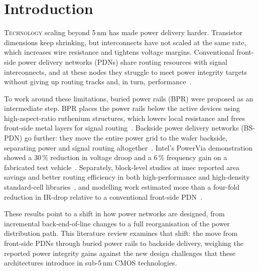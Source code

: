 \section{Introduction}

\lettrine{T}{echnology} scaling beyond 5\,nm has made power delivery harder. Transistor dimensions keep shrinking, but interconnects have not scaled at the same rate, which increases wire resistance and tightens voltage margins. Conventional front-side power delivery networks (PDNs) share routing resources with signal interconnects, and at these nodes they struggle to meet power integrity targets without giving up routing tracks and, in turn, performance~\cite{8993617}.

To work around these limitations, buried power rails (BPR) were proposed as an intermediate step. BPR places the power rails below the active devices using high-aspect-ratio ruthenium structures, which lowers local resistance and frees front-side metal layers for signal routing~\cite{8993617}. Backside power delivery networks (BS-PDN) go further: they move the entire power grid to the wafer backside, separating power and signal routing altogether~\cite{10185208}. Intel's PowerVia demonstration showed a 30\,\% reduction in voltage droop and a 6\,\% frequency gain on a fabricated test vehicle~\cite{10185208}. Separately, block-level studies at imec reported area savings and better routing efficiency in both high-performance and high-density standard-cell libraries~\cite{10631463}, and modelling work estimated more than a four-fold reduction in IR-drop relative to a conventional front-side PDN~\cite{8932458}.

These results point to a shift in how power networks are designed, from incremental back-end-of-line changes to a full reorganisation of the power distribution path. This literature review examines that shift: the move from front-side PDNs through buried power rails to backside delivery, weighing the reported power integrity gains against the new design challenges that these architectures introduce in sub-5\,nm CMOS technologies.
